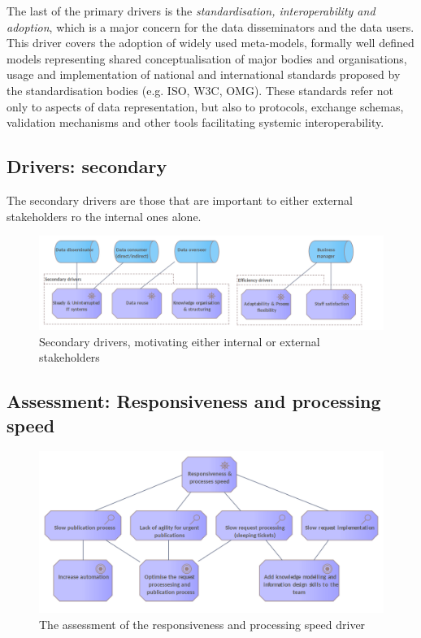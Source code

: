 	The last of the primary drivers is the \textit{standardisation, interoperability and adoption}, which is a major concern for the data disseminators and the data users. This driver covers the adoption of widely used meta-models, formally well defined models representing shared conceptualisation of major bodies and organisations, usage and implementation of national and international standards proposed by the standardisation bodies (e.g. ISO, W3C, OMG). These standards refer not only to aspects of data representation, but also to protocols, exchange schemas, validation mechanisms and other tools facilitating systemic interoperability. 
	
	\subsection{Drivers: secondary}
	The secondary drivers are those that are important to either external stakeholders ro the internal ones alone.
	
	\begin{figure}[h!]
		\centering
		\includegraphics[width=1.05\textwidth]{images/motivation/Secondary drivers.png}
		\caption{Secondary drivers, motivating either internal or external stakeholders}
		\label{fig:secondary drivers}
	\end{figure}

	
	\subsection{Assessment: Responsiveness and processing speed}
	
	\begin{figure}[h]
		\centering
		\includegraphics[width=\textwidth]{images/motivation/Responsiveless & Process Speed.png}
		\caption{The assessment of the responsiveness and processing speed driver}
		\label{fig:responsiveness-and-processing-speed}
	\end{figure}

